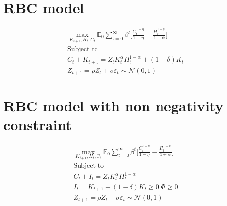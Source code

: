 \documentclass{article}
\newcommand{\E}{\mathbb{E}}
\begin{document}
\thispagestyle{empty}
\section{RBC model}
\begin{gather*}
	\max_{K_{t+1},H_t,C_t} \E_0 \sum_{t=0}^\infty \beta^t\bigg[ \frac{C_{t}^{1-\eta}}{1-\eta} - \frac{H_t^{1+\psi}}{1+\psi}   \bigg]
	\\
	\text{Subject to}
	\\
	C_t + K_{t+1} = Z_t K_t^\alpha H_t^{1-\alpha} + (1-\delta)K_t
	\\
	Z_{t+1} = \rho Z_{t} + \sigma \varepsilon_t \sim \mathcal{N}(0,1)
\end{gather*}

\section{RBC model with non negativity constraint}
\begin{gather*}
	\max_{K_{t+1},H_t,C_t} \E_0 \sum_{t=0}^\infty \beta^t\bigg[ \frac{C_{t}^{1-\eta}}{1-\eta} - \frac{H_t^{1+\psi}}{1+\psi}   \bigg]
	\\
	\text{Subject to}
	\\
	C_t + I_t = Z_t K_t^\alpha H_t^{1-\alpha}
	\\
	I_t = K_{t+1} - (1-\delta)K_t \geq 0 \; \Phi \geq 0
	\\
	Z_{t+1} = \rho Z_{t} + \sigma \varepsilon_t \sim \mathcal{N}(0,1)
\end{gather*}
	
\end{document}

